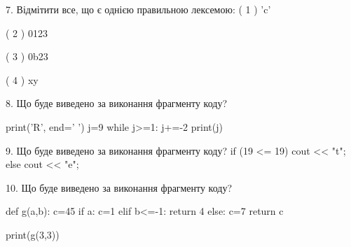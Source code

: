 \documentclass[11pt]{article}
\begin{document}
7. %
Відмітити все, що є однією правильною лексемою:
( 1 ) 'c'

( 2 ) 0123

( 3 ) 0b23

( 4 ) xy
\vspace{5mm}

8. Що буде виведено за виконання фрагменту коду?

print('R', end=' ')
j=9
while j>=1:
    j+=-2
print(j)

\vspace{5mm}

9. Що буде виведено за виконання фрагменту коду?
if (19 <= 19)
    cout << "t";
else
    cout << "e";

\vspace{5mm}

10. Що буде виведено за виконання фрагменту коду?

def g(a,b):
    c=45
    if a:
        c=1
    elif b<=-1:
         return 4
    else: 
        c=7
    return c

print(g(3,3))
\vspace{5mm}

\newpage
\end{document}
